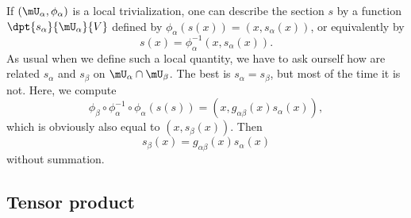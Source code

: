 If $(\mU_{\alpha},\phi_{\alpha})$ is a local trivialization, one can describe the section $s$ by a function $\dpt{s_{\alpha}}{\mU_{\alpha}}{V}$ defined by $\phi_{\alpha}(s(x))=(x,s_{\alpha}(x))$, or equivalently by
\[
	s(x)=\phi_{\alpha}^{-1}(x,s_{\alpha}(x)).
\]
As usual when we define such a local quantity, we have to ask ourself how are related $s_{\alpha}$ and $s_{\beta}$ on $\mU_{\alpha}\cap\mU_{\beta}$. The best is $s_{\alpha}=s_{\beta}$, but most of the time it is not. Here, we compute
\[
	\phi_{\beta}\circ\phi_{\alpha}^{-1}\circ\phi_{\alpha}(s(s))=(x,g_{\alpha\beta}(x)s_{\alpha}(x)),
\]
which is obviously also equal to $(x,s_{\beta}(x))$. Then
\begin{equation}\label{eq:tr_sec}
	s_{\beta}(x)=g_{\alpha\beta}(x)s_{\alpha}(x)
\end{equation}
without summation.

\subsection{Tensor product}


